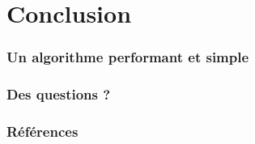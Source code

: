 \documentclass[10pt]{beamer}
\begin{document}

\section{Conclusion}
\label{sec:conclusion}

\begin{frame}
  \frametitle{Un algorithme performant et simple}
\end{frame}

\begin{frame}
  \frametitle{Des questions ?}
\end{frame}

\begin{frame}
  \frametitle{Références}
  
  
\end{frame}
\end{document}
